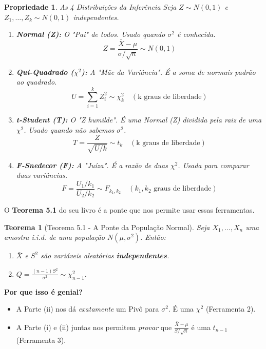 \documentclass[12pt, a4paper]{article}
\newtheorem{teorema}{Teorema}[section]
\newtheorem{propriedade}{Propriedade}[section]
\theoremstyle{definition} %
\theoremstyle{remark} %
\begin{document}
\begin{propriedade}{As 4 Distribuições da Inferência}
    Seja $Z \sim N(0,1)$ e $Z_1, \dots, Z_k \sim N(0,1)$ independentes.
    \begin{enumerate}
        \item \textbf{Normal (Z):} O "Pai" de todos. Usado quando $\sigma^2$ é conhecida.
            $$ Z = \frac{\bar{X} - \mu}{\sigma / \sqrt{n}} \sim N(0,1) $$
        \item \textbf{Qui-Quadrado ($\chi^2$):} A "Mãe da Variância". É a soma de normais padrão ao quadrado.
            $$ U = \sum_{i=1}^k Z_i^2 \sim \chi^2_k \quad (\text{k graus de liberdade}) $$
        \item \textbf{t-Student (T):} O "Z humilde". É uma Normal (Z) dividida pela raiz de uma $\chi^2$. Usado quando \textit{não} sabemos $\sigma^2$.
            $$ T = \frac{Z}{\sqrt{U/k}} \sim t_k \quad (\text{k graus de liberdade}) $$
        \item \textbf{F-Snedecor (F):} A "Juíza". É a razão de duas $\chi^2$. Usada para \textit{comparar} duas variâncias.
            $$ F = \frac{U_1 / k_1}{U_2 / k_2} \sim F_{k_1, k_2} \quad (\text{$k_1, k_2$ graus de liberdade}) $$
    \end{enumerate}
\end{propriedade}

O \textbf{Teorema 5.1} do seu livro é a ponte que nos permite usar essas ferramentas.

\begin{teorema}[Teorema 5.1 - A Ponte da População Normal]
    Seja $X_1, \dots, X_n$ uma amostra i.i.d. de uma população $N(\mu, \sigma^2)$. Então:
    \begin{enumerate}
        \item[(i)] $\bar{X}$ e $S^2$ são variáveis aleatórias \textbf{independentes}.
        \item[(ii)] $Q = \frac{(n-1)S^2}{\sigma^2} \sim \chi^2_{n-1}$.
    \end{enumerate}
\end{teorema}
\textbf{Por que isso é genial?}
\begin{itemize}
    \item A Parte (ii) nos dá \textit{exatamente} um Pivô para $\sigma^2$. É uma $\chi^2$ (Ferramenta 2).
    \item A Parte (i) e (ii) juntas nos permitem \textit{provar} que $\frac{\bar{X} - \mu}{S / \sqrt{n}}$ é uma $t_{n-1}$ (Ferramenta 3).
\end{itemize}
\end{document}
